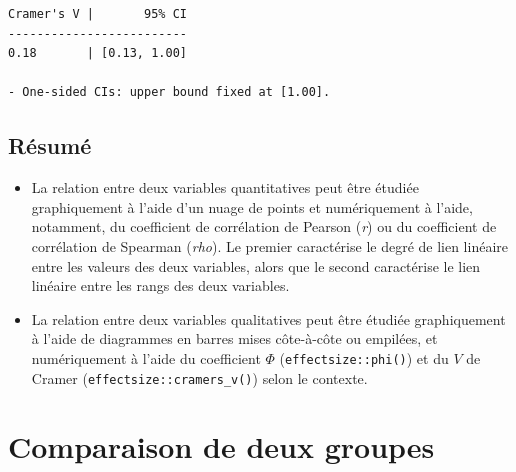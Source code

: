 \documentclass[
  letterpaper,
]{book}
\newenvironment{Shaded}{\begin{snugshade}}{\end{snugshade}}
\newcommand{\AttributeTok}[1]{\textcolor[rgb]{0.40,0.45,0.13}{#1}}
\newcommand{\CommentTok}[1]{\textcolor[rgb]{0.37,0.37,0.37}{#1}}
\newcommand{\ConstantTok}[1]{\textcolor[rgb]{0.56,0.35,0.01}{#1}}
\newcommand{\FunctionTok}[1]{\textcolor[rgb]{0.28,0.35,0.67}{#1}}
\newcommand{\NormalTok}[1]{\textcolor[rgb]{0.00,0.23,0.31}{#1}}
\newcommand{\OtherTok}[1]{\textcolor[rgb]{0.00,0.23,0.31}{#1}}
\newcommand{\SpecialCharTok}[1]{\textcolor[rgb]{0.37,0.37,0.37}{#1}}
\providecommand{\tightlist}{%
  \setlength{\itemsep}{0pt}\setlength{\parskip}{0pt}}\usepackage{longtable,booktabs,array}
\begin{document}
\begin{Shaded}
\end{Shaded}

\begin{verbatim}
Cramer's V |       95% CI
-------------------------
0.18       | [0.13, 1.00]

- One-sided CIs: upper bound fixed at [1.00].
\end{verbatim}

\section{Résumé}\label{ruxe9sumuxe9-3}

\begin{itemize}
\tightlist
\item
  La relation entre deux variables quantitatives peut être étudiée
  graphiquement à l'aide d'un nuage de points et numériquement à l'aide,
  notamment, du coefficient de corrélation de Pearson (\emph{r}) ou du
  coefficient de corrélation de Spearman (\emph{rho}). Le premier
  caractérise le degré de lien linéaire entre les valeurs des deux
  variables, alors que le second caractérise le lien linéaire entre les
  rangs des deux variables.
\item
  La relation entre deux variables qualitatives peut être étudiée
  graphiquement à l'aide de diagrammes en barres mises côte-à-côte ou
  empilées, et numériquement à l'aide du coefficient \(\Phi\)
  (\texttt{effectsize::phi()}) et du \(V\) de Cramer
  (\texttt{effectsize::cramers\_v()}) selon le contexte.
\end{itemize}

\chapter{Comparaison de deux groupes}\label{comparaison-de-deux-groupes}
\end{document}
